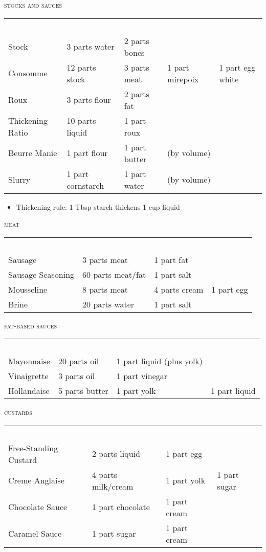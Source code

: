 \documentclass[letterpaper,11pt]{article}
\newcommand{\sectionheader}[1]{
    \vspace{0.5em}
    {\small\textsc{#1}} \\
}
\begin{document}
\sectionheader{stocks and sauces}
{ \small
\begin{tabularx}{\textwidth}{ l X X X X }
\rowcolor{white}
~ \\
Stock & 3 parts water & 2 parts bones & & \\
Consomme & 12 parts stock & 3 parts meat & 1 part mirepoix & 1 part egg white \\
Roux & 3 parts flour & 2 parts fat & & \\
Thickening Ratio & 10 parts liquid & 1 part roux & & \\
Beurre Manie & 1 part flour & 1 part butter & (by volume) & \\
Slurry & 1 part cornstarch & 1 part water & (by volume) & \\
\end{tabularx}
}

{ \small
\begin{itemize}[topsep=4pt]
  \item Thickening rule: 1 Tbsp starch thickens 1 cup liquid
\end{itemize}
}

\sectionheader{meat}
{ \small
\begin{tabularx}{\textwidth}{ l X X X }
\rowcolor{white}
~ \\
Sausage & 3 parts meat & 1 part fat & \\
Sausage Seasoning & 60 parts meat/fat & 1 part salt \\
Mousseline & 8 parts meat & 4 parts cream & 1 part egg \\
Brine & 20 parts water & 1 part salt & \\
\end{tabularx}
}

\sectionheader{fat-based sauces}
{ \small
\begin{tabularx}{\textwidth}{ l X X X }
\rowcolor{white}
~ \\
Mayonnaise & 20 parts oil & 1 part liquid (plus yolk) & \\
Vinaigrette & 3 parts oil & 1 part vinegar & \\
Hollandaise & 5 parts butter & 1 part yolk & 1 part liquid \\
\end{tabularx}
}

\sectionheader{custards}
{ \small
\begin{tabularx}{\textwidth}{ l X X X }
\rowcolor{white}
~ \\
Free-Standing Custard & 2 parts liquid & 1 part egg & \\
Creme Anglaise & 4 parts milk/cream & 1 part yolk & 1 part sugar \\
Chocolate Sauce & 1 part chocolate & 1 part cream & \\
Caramel Sauce & 1 part sugar & 1 part cream & \\
\end{tabularx}
}
\end{document}
